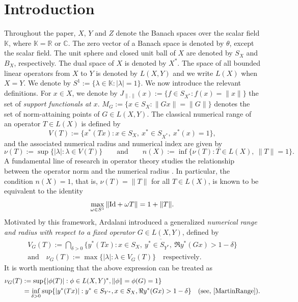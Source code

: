 \documentclass[12pt]{amsart}
\theoremstyle{definition}
\numberwithin{equation}{section}
\begin{document}
	\section{Introduction}
	Throughout the paper, $X$, $Y$ and $Z$ denote the Banach spaces over the scalar field $\mathbb{K}$, where $\mathbb{K}=\mathbb{R}$ or $\mathbb{C}$. The zero vector of a Banach space is denoted by $\theta$, except the scalar field. The unit sphere and closed unit ball of $X$ are denoted by $S_X$ and $B_X$, respectively. The dual space of $X$ is denoted by $X^*$. The space of all bounded linear operators from $X$ to $Y$ is denoted by $L(X,Y)$ and we write $L(X)$ when $X=Y$. We denote by $S^1:=\{\lambda\in\mathbb{K} : |\lambda|=1\}.$ We now introduce the relevant definitions. For $x\in X$, we denote by $J_{\|.\|}(x) :=\{f\in S_{X^*}: f(x)=\|x\|\}$ the set of \emph{support functionals at $x$}. $M_G :=\{x\in S_X : \|Gx\|=\|G\|\}$ denotes the set of norm-attaining points of $G\in L(X, Y)$. The classical numerical range of an operator $T\in L(X)$ is defined by
    \[
    V(T):=\{x^*(Tx): x\in S_X,\ x^*\in S_{X^*},\ x^*(x)=1\},
    \]
    and the associated numerical radius and numerical index are given by
    \[
    \nu(T):=\sup\{|\lambda|:\lambda\in V(T)\}\qquad \text{and} \qquad n(X):=\inf\{\nu(T): T\in L(X),\ \|T\|=1\}.
    \]
    A fundamental line of research in operator theory studies the relationship between the operator norm and the numerical radius \cite{BonsallDuncan, Duncan}. In particular, the condition $n(X)=1$, that is, $\nu(T)=\|T\|$ for all $T\in L(X)$, is known to be equivalent to the identity
    \begin{equation}\label{eq:intro-classical}
    \max_{\omega\in S^1}\|{\rm Id}+\omega T\|=1+\|T\|.
    \end{equation}
    Motivated by this framework, Ardalani \cite{Ardalani} introduced a generalized \emph{numerical range and radius with respect to a fixed operator $G\in L(X,Y)$}, defined by
    \begin{align*}
        V_G(T):=\bigcap_{\delta>0}\overline{\{y^*(Tx): x\in S_X,\ y^*\in S_{Y^*},\ \Re y^*(Gx)>1-\delta\}}\\
        \text{and}\quad\nu_G(T):=\max\{|\lambda|:\lambda\in V_G(T)\}\quad\text{respectively}.
    \end{align*}
    It is worth mentioning that the above expression can be treated as
    \begin{align*}
		\nu_G(T) & := \sup\{|\phi(T)| : \phi \in L(X,Y)^*, \|\phi\| = \phi(G) = 1\}\\
		& = \inf_{\delta>0} \sup\{|y^*(Tx)| : y^* \in S_{Y^*}, x \in S_X, \Re  y^*(Gx) > 1 - \delta\}\quad \text{(see, \cite[Theorem 2.1]{MartinRange})}.    
	\end{align*}
\end{document}
